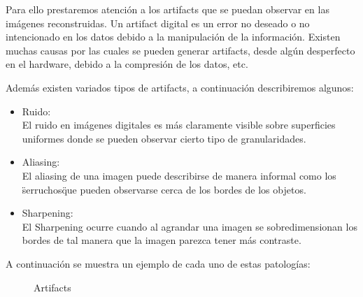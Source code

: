 Para ello prestaremos atención a los artifacts que se puedan observar en las imágenes reconstruidas. Un artifact digital es un error no deseado o no intencionado en los datos debido a la manipulación de la información. Existen muchas causas por las cuales se pueden generar artifacts, desde algún desperfecto en el hardware, debido a la compresión de los datos, etc.

Además existen variados tipos de artifacts, a continuación describiremos algunos:

\begin{itemize}
 \item Ruido:
 \\
 	El ruido en imágenes digitales es más claramente visible sobre superficies uniformes donde se pueden observar cierto tipo de granularidades.
 \item Aliasing:
 \\
 	El aliasing de una imagen puede describirse de manera informal como los \"serruchos\" que pueden observarse cerca de los bordes de los objetos.
 \item Sharpening:
 \\
 El Sharpening ocurre cuando al agrandar una imagen se sobredimensionan los bordes de tal manera que la imagen parezca tener más contraste.
\end{itemize}
A continuación se muestra un ejemplo de cada uno de estas patologías:
\begin{figure}[H]
\centering
{}
\qquad
{}
\qquad
{}
\caption{Artifacts}
\end{figure}

